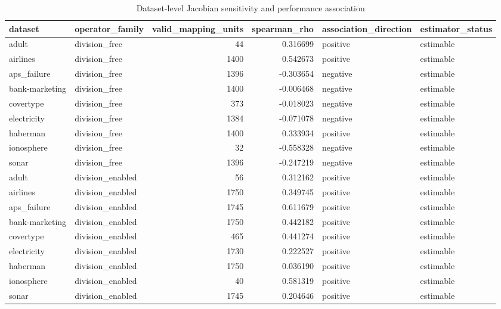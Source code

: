 \begin{table}
\caption{Dataset-level Jacobian sensitivity and performance association}
\begin{tabular}{llrrll}
\toprule
dataset & operator\_family & valid\_mapping\_units & spearman\_rho & association\_direction & estimator\_status \\
\midrule
adult & division\_free & 44 & 0.316699 & positive & estimable \\
airlines & division\_free & 1400 & 0.542673 & positive & estimable \\
aps\_failure & division\_free & 1396 & -0.303654 & negative & estimable \\
bank-marketing & division\_free & 1400 & -0.006468 & negative & estimable \\
covertype & division\_free & 373 & -0.018023 & negative & estimable \\
electricity & division\_free & 1384 & -0.071078 & negative & estimable \\
haberman & division\_free & 1400 & 0.333934 & positive & estimable \\
ionosphere & division\_free & 32 & -0.558328 & negative & estimable \\
sonar & division\_free & 1396 & -0.247219 & negative & estimable \\
adult & division\_enabled & 56 & 0.312162 & positive & estimable \\
airlines & division\_enabled & 1750 & 0.349745 & positive & estimable \\
aps\_failure & division\_enabled & 1745 & 0.611679 & positive & estimable \\
bank-marketing & division\_enabled & 1750 & 0.442182 & positive & estimable \\
covertype & division\_enabled & 465 & 0.441274 & positive & estimable \\
electricity & division\_enabled & 1730 & 0.222527 & positive & estimable \\
haberman & division\_enabled & 1750 & 0.036190 & positive & estimable \\
ionosphere & division\_enabled & 40 & 0.581319 & positive & estimable \\
sonar & division\_enabled & 1745 & 0.204646 & positive & estimable \\
\bottomrule
\end{tabular}
\end{table}
